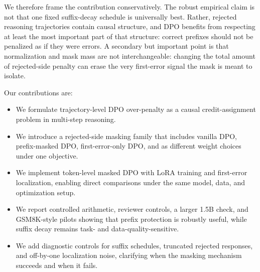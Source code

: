 We therefore frame the contribution conservatively. The robust empirical claim is not that one fixed suffix-decay schedule is universally best. Rather, rejected reasoning trajectories contain causal structure, and DPO benefits from respecting at least the most important part of that structure: correct prefixes should not be penalized as if they were errors. A secondary but important point is that normalization and mask mass are not interchangeable: changing the total amount of rejected-side penalty can erase the very first-error signal the mask is meant to isolate.

Our contributions are:
\begin{itemize}
    \item We formulate trajectory-level DPO over-penalty as a causal credit-assignment problem in multi-step reasoning.
    \item We introduce a rejected-side masking family that includes vanilla DPO, prefix-masked DPO, first-error-only DPO, and \cmdpo{} as different weight choices under one objective.
    \item We implement token-level masked DPO with LoRA training and first-error localization, enabling direct comparisons under the same model, data, and optimization setup.
    \item We report controlled arithmetic, reviewer controls, a larger 1.5B check, and GSM8K-style pilots showing that prefix protection is robustly useful, while suffix decay remains task- and data-quality-sensitive.
    \item We add diagnostic controls for suffix schedules, truncated rejected responses, and off-by-one localization noise, clarifying when the masking mechanism succeeds and when it fails.
\end{itemize}
